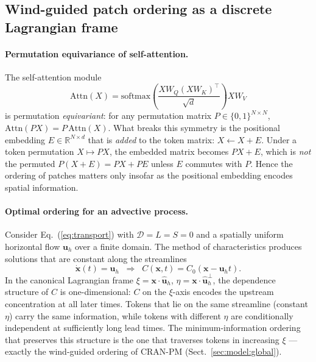 \subsection{Wind-guided patch ordering as a discrete Lagrangian frame}
\label{app:theory:shuffle}

\paragraph{Permutation equivariance of self-attention.}
The self-attention module
\begin{equation}
\mathrm{Attn}(X) = \mathrm{softmax}\!\left(\frac{XW_Q(XW_K)^\top}{\sqrt{d}}\right) XW_V
\label{eq:attn_perm}
\end{equation}
is permutation \emph{equivariant}: for any permutation matrix
$P\in\{0,1\}^{N\times N}$, $\mathrm{Attn}(PX)=P\,\mathrm{Attn}(X)$.
What breaks this symmetry is the positional embedding $E\in\mathbb{R}^{N\times d}$ that is
\emph{added} to the token matrix: $X \leftarrow X+E$. Under a token
permutation $X\mapsto PX$, the embedded matrix becomes $PX+E$, which is
\emph{not} the permuted $P(X+E) = PX + PE$ unless $E$ commutes with
$P$. Hence the ordering of patches matters only insofar as the
positional embedding encodes spatial information.

\paragraph{Optimal ordering for an advective process.}
Consider Eq.~(\ref{eq:transport}) with $\mathcal{D}=L=S=0$ and a
spatially uniform horizontal flow $\mathbf{u}_h$ over a finite domain.
The method of characteristics produces solutions that are constant
along the streamlines
\begin{equation}
\dot{\mathbf{x}}(t) = \mathbf{u}_h \;\;\Longrightarrow\;\;
C(\mathbf{x},t) = C_0(\mathbf{x}-\mathbf{u}_h t).
\end{equation}
In the canonical Lagrangian frame
$\xi = \mathbf{x}\cdot\hat{\mathbf{u}}_h$, $\eta =
\mathbf{x}\cdot\hat{\mathbf{u}}_h^{\perp}$,
the dependence structure of $C$ is one-dimensional: $C$ on the
$\xi$-axis encodes the upstream concentration at all later times.
Tokens that lie on the same streamline (constant $\eta$) carry the
same information, while tokens with different $\eta$ are conditionally
independent at sufficiently long lead times. The minimum-information
ordering that preserves this structure is the one that traverses
tokens in increasing $\xi$ — exactly the wind-guided ordering of
CRAN-PM (Sect.~\ref{sec:model:global}).


